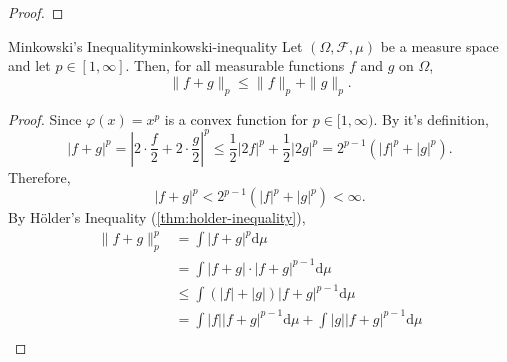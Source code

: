 \begin{proof}

\end{proof}

\begin{theorem}{Minkowski's Inequality}{minkowski-inequality}
    Let $(\Omega,\mathcal{F},\mu)$ be a measure space and let $p\in[1,\infty]$. Then, for all measurable functions $f$ and $g$ on $\Omega$,
    \begin{equation}
        \|f+g\|_{p} \leq\|f\|_{p}+\|g\|_{p}.
    \end{equation}
\end{theorem}

\begin{proof}
    Since $\varphi(x)=x^p$ is a convex function for $p\in[1,\infty)$. By it's definition,
    \begin{equation*}
        |f+g|^{p}=\left|2\cdot\frac{f}{2}+2\cdot\frac{g}{2}\right|^{p}\leq \frac{1}{2}|2f|^p+\frac{1}{2}|2g|^p=2^{p-1}\left(|f|^{p}+|g|^{p}\right).
    \end{equation*}
    Therefore,
    \begin{equation*}
        |f+g|^{p}<2^{p-1}\left(|f|^{p}+|g|^{p}\right)<\infty.
    \end{equation*}
    By H\"older's Inequality (\ref{thm:holder-inequality}),
    \begin{equation*}
        \begin{aligned}
            \|f+g\|_{p}^{p} & =\int|f+g|^{p}\mathrm{d}\mu                                                                                                                                                                                         \\
                            & =\int|f+g| \cdot|f+g|^{p-1}\mathrm{d} \mu                                                                                                                                                                           \\
                            & \leq \int(|f|+|g|)|f+g|^{p-1}\mathrm{d}\mu                                                                                                                                                                          \\
                            & =\int|f||f+g|^{p-1}\mathrm{d}\mu+\int|g||f+g|^{p-1}\mathrm{d}\mu                                                                                                                                                    \\

\end{aligned}
\end{equation*}
\end{proof}

